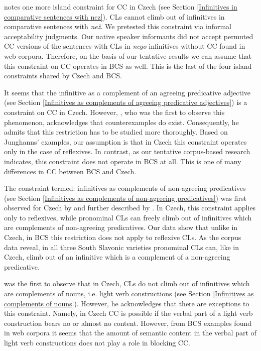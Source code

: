 \citet{Junghanns02} notes one more island constraint for CC in Czech (see Section \ref{Infinitives in comparative sentences with nez}). CLs cannot climb out of infinitives in comparative sentences with \textit{než}. We pretested this constraint via informal acceptability judgments. Our native speaker informants did not accept permuted CC versions of the sentences with CLs in \textit{nego} infinitives without CC found in web corpora. Therefore, on the basis of our tentative results we can assume that this constraint on CC operates in BCS as well. This is the last of the four island constraints shared by Czech and BCS. 

It seems that the infinitive as a complement of an agreeing predicative adjective (see Section \ref{Infinitives as complements of agreeing predicative adjectives}) is a constraint on CC in Czech. However, \citet{Junghanns02}, who was the first to observe this phenomenon, acknowledges that counterexamples do exist. Consequently, he admits that this restriction has to be studied more thoroughly. Based on Junghanns’ examples, our assumption is that in Czech this constraint operates only in the case of reflexives. In contrast, as our tentative corpus-based research indicates, this constraint does not operate in BCS at all. This is one of many differences in CC between BCS and Czech. 

The constraint termed: infinitives as complements of non-agreeing predicatives (see Section \ref{Infinitives as complements of non-agreeing predicatives}) was first observed for Czech by \citet{Junghanns02} and further described by \citet{Dotlacil04}. In Czech, this constraint applies only to reflexives, while pronominal CLs can freely climb out of infinitives which are complements of non-agreeing predicatives. Our data show that unlike in Czech, in BCS this restriction does not apply to reflexive CLs. As the corpus data reveal, in all three South Slavonic varieties pronominal CLs can, like in Czech, climb out of an infinitive which is a complement of a non-agreeing predicative. 

\citet{Junghanns02} was the first to observe that in Czech, CLs do not climb out of infinitives which are complements of nouns, i.e. light verb constructions (see Section \ref{Infinitives as complements of nouns}). However, he acknowledges that there are exceptions to this constraint. Namely, in Czech CC is possible if the verbal part of a light verb construction bears no or almost no content. However, from BCS examples found in web corpora it seems that the amount of semantic content in the verbal part of light verb constructions does not play a role in blocking CC. 

